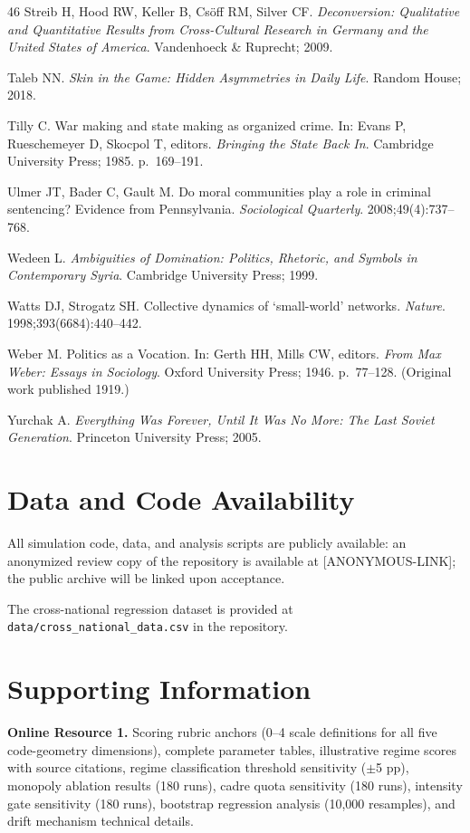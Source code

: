 \documentclass[12pt]{article}
\begin{document}
\begin{thebibliography}{46}
Streib H, Hood RW, Keller B, Cs\"{o}ff RM, Silver CF.
\textit{Deconversion: Qualitative and Quantitative Results from Cross-Cultural Research in Germany and the United States of America}.
Vandenhoeck \& Ruprecht; 2009.

Taleb NN.
\textit{Skin in the Game: Hidden Asymmetries in Daily Life}.
Random House; 2018.

Tilly C.
War making and state making as organized crime.
In: Evans P, Rueschemeyer D, Skocpol T, editors.
\textit{Bringing the State Back In}.
Cambridge University Press; 1985. p.~169--191.

Ulmer JT, Bader C, Gault M.
Do moral communities play a role in criminal sentencing? Evidence from Pennsylvania.
\textit{Sociological Quarterly}. 2008;49(4):737--768.

Wedeen L.
\textit{Ambiguities of Domination: Politics, Rhetoric, and Symbols in Contemporary Syria}.
Cambridge University Press; 1999.

Watts DJ, Strogatz SH.
Collective dynamics of `small-world' networks.
\textit{Nature}. 1998;393(6684):440--442.

Weber M.
Politics as a Vocation.
In: Gerth HH, Mills CW, editors.
\textit{From Max Weber: Essays in Sociology}.
Oxford University Press; 1946. p.~77--128.
(Original work published 1919.)

Yurchak A.
\textit{Everything Was Forever, Until It Was No More: The Last Soviet Generation}.
Princeton University Press; 2005.

\end{thebibliography}

\section*{Data and Code Availability}

All simulation code, data, and analysis scripts are publicly available: an anonymized review copy of the repository is available at [ANONYMOUS-LINK]; the public archive will be linked upon acceptance.

The cross-national regression dataset is provided at \texttt{data/cross\_national\_data.csv}
in the repository.

\section*{Supporting Information}

\noindent\textbf{Online Resource 1.} Scoring rubric anchors (0--4 scale definitions for all five code-geometry dimensions), complete parameter tables, illustrative regime scores with source citations, regime classification threshold sensitivity ($\pm$5 pp), monopoly ablation results (180 runs), cadre quota sensitivity (180 runs), intensity gate sensitivity (180 runs), bootstrap regression analysis (10,000 resamples), and drift mechanism technical details.
\end{document}
